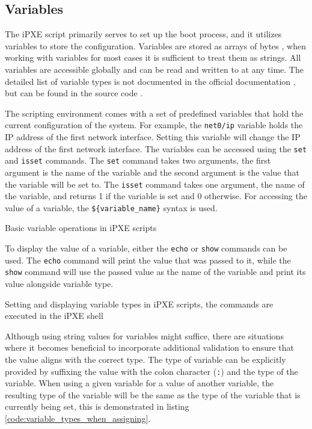 \documentclass[../main.tex]{subfiles}
\begin{document}
\subsection{Variables}

The iPXE script primarily serves to set up the boot process, and it utilizes variables to store the configuration.
Variables are stored as arrays of bytes \cite{ipxe_settings_types_docs}, when working with variables for most cases it is sufficient to treat them as strings.
All variables are accessible globally and can be read and written to at any time.
The detailed list of variable types is not documented in the official documentation \cite{ipxe}, but can be found in the source code \cite{ipxe_settings_types_docs}.


The scripting environment comes with a set of predefined variables that hold the current configuration of the system.
For example, the \texttt{net0/ip} variable holds the IP address of the first network interface. Setting
this variable will change the IP address of the first network interface.
The variables can be accessed using the \texttt{set} and \texttt{isset} commands.
The \texttt{set} command takes two arguments, the first argument is the name of the variable and the second argument is the value that the variable will be set to.
The \texttt{isset} command takes one argument, the name of the variable, and returns 1 if the variable is set and 0 otherwise.
For accessing the value of a variable, the \texttt{\$\{variable\_name\}} syntax is used.

\begin{listing}[H]
  \caption{Basic variable operations in iPXE scripts}
\end{listing}

To display the value of a variable, either the \texttt{echo} or \texttt{show} commands can be used.
The \texttt{echo} command will print the value that was passed to it, while the \texttt{show} command
will use the passed value as the name of the variable and print its value alongside variable type.

\begin{listing}[H]
  \caption{Setting and displaying variable types in iPXE scripts, the commands are executed in the iPXE shell}
\end{listing}


Although using string values for variables might suffice, there are situations where it becomes beneficial to incorporate additional validation to ensure that the value aligns with the correct type.
The type of variable can be explicitly provided by suffixing the value with the colon character (\texttt{:}) and the type of the variable.
When using a given variable for a value of another variable, the resulting type of the variable will be the same as the type of the variable that is currently being set, this
is demonstrated in listing \ref{code:variable_types_when_assigning}.
\end{document}
